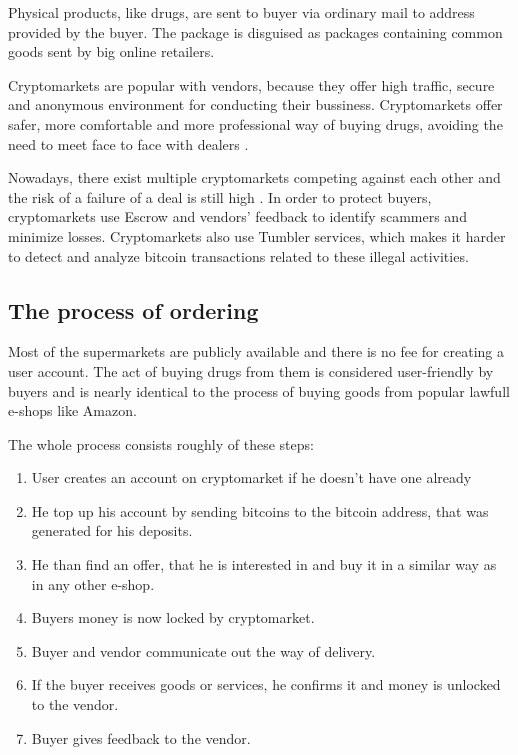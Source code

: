 \documentclass[
  digital, %
  table,   %
  lof,     %
  lot,     %
  oneside
]{fithesis3}
\begin{document}
Physical products, like drugs, are sent to buyer via ordinary mail to address provided by the buyer.
The package is disguised as packages containing common goods sent by big online retailers.
\parencite{paquet2017cryptomarkets}

Cryptomarkets are popular with vendors,
because they offer high traffic, secure and anonymous environment for conducting their bussiness\parencite {van2014responsible}.
Cryptomarkets offer safer, more comfortable and more professional way of buying drugs, avoiding 
the need to meet face to face with dealers \parencite{barratt2014use}.

Nowadays, there exist multiple cryptomarkets competing against each other and the risk
of a failure of a deal is still high \parencite{wehinger2011dark}.
In order to protect buyers, cryptomarkets use Escrow and vendors' feedback to identify scammers and minimize losses.
Cryptomarkets also use Tumbler services, which makes it harder to detect and analyze bitcoin transactions
 related to these illegal activities.

\subsection{The process of ordering}
Most of the supermarkets are publicly available and there is no fee
for creating a user account. The act of buying drugs from them is considered user-friendly by buyers and is nearly identical to the process of buying goods from popular lawfull e-shops like Amazon.

 The whole process consists roughly of these steps:
\begin{enumerate}
\item User creates an account on cryptomarket if he doesn't have one already
\item He top up his account by sending bitcoins to the bitcoin address,
that was generated for his deposits.
\item He than find an offer, that he is interested in and buy it in a similar
way as in any other e-shop.
\item Buyers money is now locked by cryptomarket.
\item Buyer and vendor communicate out the way of delivery.
\item If the buyer receives goods or services, he confirms it and money is unlocked to the vendor.
\item Buyer gives feedback to the vendor. 
\end{enumerate}
\end{document}
